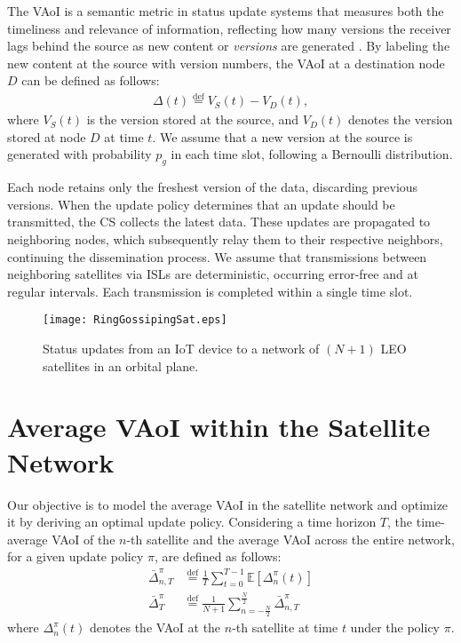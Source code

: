 \documentclass[lettersize,journal]{IEEEtran}
\begin{document}
    The VAoI is a semantic metric in status update systems that measures both the timeliness and relevance of information, reflecting how many versions the receiver lags behind the source as new content or \emph{versions} are generated \cite{yates2021Vage}. By labeling the new content at the source with version numbers, the VAoI at a destination node $D$ can be defined as follows:
    \begin{align}
        \Delta(t) \overset{\text{def}}{=} V_S(t) - V_D(t),
    \end{align}
    where $V_S(t)$ is the version stored at the source, and $V_D(t)$ denotes the version stored at node $D$ at time $t$. We assume that a new version at the source is generated with probability $p_g$ in each time slot, following a Bernoulli distribution.

    Each node retains only the freshest version of the data, discarding previous versions. When the update policy determines that an update should be transmitted, the CS collects the latest data. These updates are propagated to neighboring nodes, which subsequently relay them to their respective neighbors, continuing the dissemination process. We assume that transmissions between neighboring satellites via ISLs are deterministic, occurring error-free and at regular intervals. Each transmission is completed within a single time slot.

    \begin{figure}[t!]
		\centering
		\texttt{[image: RingGossipingSat.eps]}
		\caption{Status updates from an IoT device to a network of $(N+1)$ LEO satellites in an orbital plane.}
        \vspace{-8pt}
		\label{fig_SysModel}
    \end{figure}

    \section{Average VAoI within the Satellite Network}
    \label{Sec_SysSetup}

    Our objective is to model the average VAoI in the satellite network and optimize it by deriving an optimal update policy. Considering a time horizon $T$, the time-average VAoI of the $n$-th satellite and the average VAoI across the entire network, for a given update policy $\pi$, are defined as follows:
    \begin{align}
        \label{eqn_FiniteHorizonAverageVAoIn}
        \bar{\Delta}_{n,T}^\pi & \overset{\text{def}}{=} \frac{1}{T} \sum_{t=0}^{T-1} \mathbb{E} \left[ \Delta_n^\pi(t) \right] \\
        \label{eqn_FiniteHorizonAverageVAoI}
        \bar{\Delta}_T^\pi &\overset{\text{def}}{=} \frac{1}{N+1} \sum_{n=-\frac{N}{2}}^{\frac{N}{2}} \bar{\Delta}_{n,T}^\pi
    \end{align}
    where $\Delta_n^\pi(t)$ denotes the VAoI at the $n$-th satellite at time $t$ under the policy $\pi$.
\end{document}
